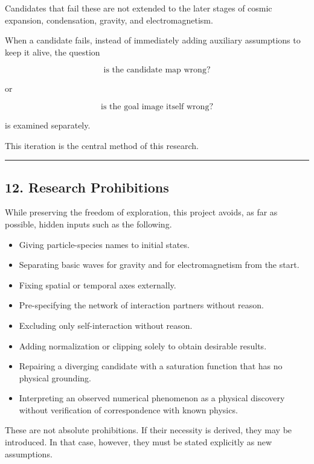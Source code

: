 \documentclass[
  a4paper,
]{article}
\providecommand{\tightlist}{%
  \setlength{\itemsep}{0pt}\setlength{\parskip}{0pt}}
\begin{document}
Candidates that fail these are not extended to the later stages of
cosmic expansion, condensation, gravity, and electromagnetism.

When a candidate fails, instead of immediately adding auxiliary
assumptions to keep it alive, the question

\[
\boxed{
\text{is the candidate map wrong?}
}
\]

or

\[
\boxed{
\text{is the goal image itself wrong?}
}
\]

is examined separately.

This iteration is the central method of this research.

\begin{center}\rule{0.5\linewidth}{0.5pt}\end{center}

\subsection{12. Research Prohibitions}\label{research-prohibitions}

While preserving the freedom of exploration, this project avoids, as far
as possible, hidden inputs such as the following.

\begin{itemize}
\tightlist
\item
  Giving particle-species names to initial states.
\item
  Separating basic waves for gravity and for electromagnetism from the
  start.
\item
  Fixing spatial or temporal axes externally.
\item
  Pre-specifying the network of interaction partners without reason.
\item
  Excluding only self-interaction without reason.
\item
  Adding normalization or clipping solely to obtain desirable results.
\item
  Repairing a diverging candidate with a saturation function that has no
  physical grounding.
\item
  Interpreting an observed numerical phenomenon as a physical discovery
  without verification of correspondence with known physics.
\end{itemize}

These are not absolute prohibitions. If their necessity is derived, they
may be introduced. In that case, however, they must be stated explicitly
as new assumptions.
\end{document}
